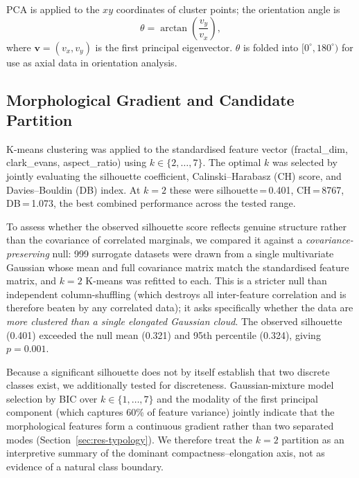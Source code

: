 \documentclass[twocolumn]{article}
\begin{document}
PCA is applied to the $xy$ coordinates of cluster points; the orientation angle is
\begin{equation}
  \theta = \arctan\!\left(\frac{v_y}{v_x}\right),
\end{equation}
where $\mathbf{v} = (v_x, v_y)$ is the first principal eigenvector. $\theta$ is folded
into $[0^\circ, 180^\circ)$ for use as axial data in orientation analysis.

\subsection{Morphological Gradient and Candidate Partition}
\label{sec:typology}

K-means clustering was applied to the standardised feature vector
(fractal\_dim, clark\_evans, aspect\_ratio) using $k \in \{2, \ldots, 7\}$.
The optimal $k$ was selected by jointly evaluating the silhouette coefficient,
Calinski--Harabasz (CH) score, and Davies--Bouldin (DB) index. At $k=2$ these were
silhouette\,=\,0.401, CH\,=\,8767, DB\,=\,1.073, the best combined performance
across the tested range.

To assess whether the observed silhouette score reflects genuine structure rather than the
covariance of correlated marginals, we compared it against a \emph{covariance-preserving} null:
999 surrogate datasets were drawn from a single multivariate Gaussian whose mean and full
covariance matrix match the standardised feature matrix, and $k=2$ K-means was refitted to each.
This is a stricter null than independent column-shuffling (which destroys all inter-feature
correlation and is therefore beaten by any correlated data); it asks specifically whether the
data are \emph{more clustered than a single elongated Gaussian cloud}. The observed silhouette
(0.401) exceeded the null mean (0.321) and 95th percentile (0.324), giving $p = 0.001$.

Because a significant silhouette does not by itself establish that two discrete classes exist,
we additionally tested for discreteness. Gaussian-mixture model selection by BIC over
$k \in \{1,\ldots,7\}$ and the modality of the first principal component (which captures 60\%
of feature variance) jointly indicate that the morphological features form a continuous
gradient rather than two separated modes (Section~\ref{sec:res-typology}). We therefore treat
the $k=2$ partition as an interpretive summary of the dominant compactness--elongation axis, not
as evidence of a natural class boundary.
\end{document}
